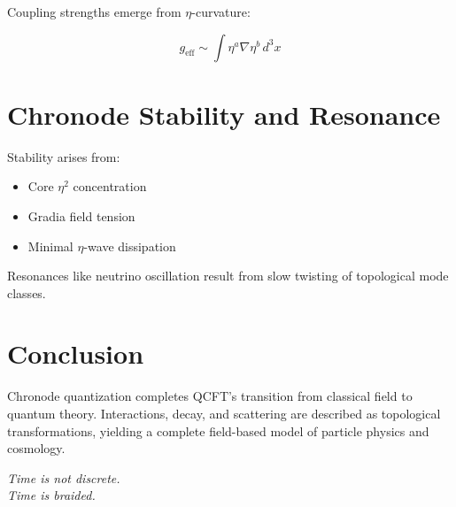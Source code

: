 \documentclass[12pt]{article}
\begin{document}
Coupling strengths emerge from $\eta$-curvature:

\[
g_{\text{eff}} \sim \int \eta^a \nabla \eta^b \, d^3x
\]

\section{Chronode Stability and Resonance}

Stability arises from:
\begin{itemize}
    \item Core $\eta^2$ concentration
    \item Gradia field tension
    \item Minimal $\eta$-wave dissipation
\end{itemize}

Resonances like neutrino oscillation result from slow twisting of topological mode classes.

\section*{Conclusion}

Chronode quantization completes QCFT’s transition from classical field to quantum theory. Interactions, decay, and scattering are described as topological transformations, yielding a complete field-based model of particle physics and cosmology.

\begin{center}
\emph{Time is not discrete.\\
Time is braided.}
\end{center}
\end{document}
